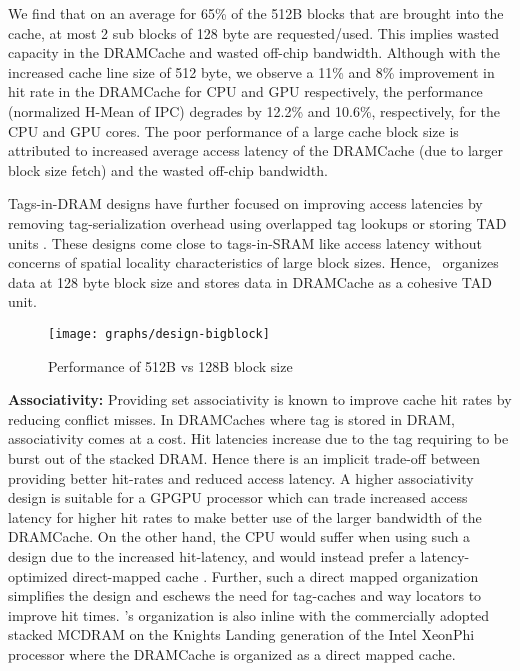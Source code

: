 We find that on an average for 65\% of the 512B blocks that are brought into the cache, at most 2 sub blocks of 128 byte are requested/used.
This implies wasted capacity in the DRAMCache and wasted off-chip bandwidth.  Although with the increased cache line size of 512 byte, we observe a 11\% and 8\% improvement in hit rate in the DRAMCache for CPU and GPU respectively, the performance (normalized H-Mean of IPC) degrades by 12.2\% and 10.6\%, respectively, for the CPU and GPU cores. The poor performance of  a large cache block size is attributed to increased average access latency of the DRAMCache (due to larger block size fetch) and the wasted off-chip bandwidth.
\par Tags-in-DRAM designs have further focused on improving access latencies by removing tag-serialization overhead using overlapped tag lookups \cite{loh-hill} or storing TAD units \cite{alloy}. These designs come close to tags-in-SRAM like access latency without concerns of spatial locality characteristics of large block sizes. 
Hence, \cachename\ organizes data at 128 byte block size and stores data in DRAMCache as a cohesive TAD unit.

\begin{figure}[htbp]
   \texttt{[image: graphs/design-bigblock]}
   \caption{Performance of 512B vs 128B block size}	
   \label{fig:design-bigblock}
\end{figure}

\par \textbf{Associativity:} Providing set associativity is known to improve cache hit rates by reducing conflict misses. In DRAMCaches where tag is stored in DRAM,  associativity comes at a cost. Hit latencies increase due to the tag requiring to be burst out of the stacked DRAM. Hence there is an implicit trade-off between providing better hit-rates and reduced access latency. A higher associativity design is suitable for a GPGPU processor which can trade increased access latency for higher hit rates to make better use of the larger bandwidth of the DRAMCache. On the other hand, the CPU would suffer when using such a design due to the increased hit-latency, and  would instead prefer a latency-optimized direct-mapped cache \cite{alloy}.
Further, such a direct mapped organization simplifies the design and eschews the need for tag-caches \cite{atcache} and way locators \cite{bimodal} to improve hit times. \cachename's organization is also inline with the commercially adopted stacked MCDRAM on the Knights Landing generation of the Intel XeonPhi processor \cite{xeonphi} where the DRAMCache is organized as a direct mapped cache.

